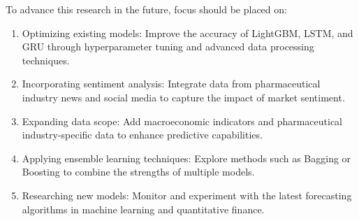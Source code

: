 \documentclass{ieeeojies}
\begin{document}
To advance this research in the future, focus should be placed on:

\begin{enumerate}
    \item Optimizing existing models: Improve the accuracy of LightGBM, LSTM, and GRU through hyperparameter tuning and advanced data processing techniques.
    \item Incorporating sentiment analysis: Integrate data from pharmaceutical industry news and social media to capture the impact of market sentiment.
    \item Expanding data scope: Add macroeconomic indicators and pharmaceutical industry-specific data to enhance predictive capabilities.
    \item Applying ensemble learning techniques: Explore methods such as Bagging or Boosting to combine the strengths of multiple models.
    \item Researching new models: Monitor and experiment with the latest forecasting algorithms in machine learning and quantitative finance.
\end{enumerate}
\end{document}
